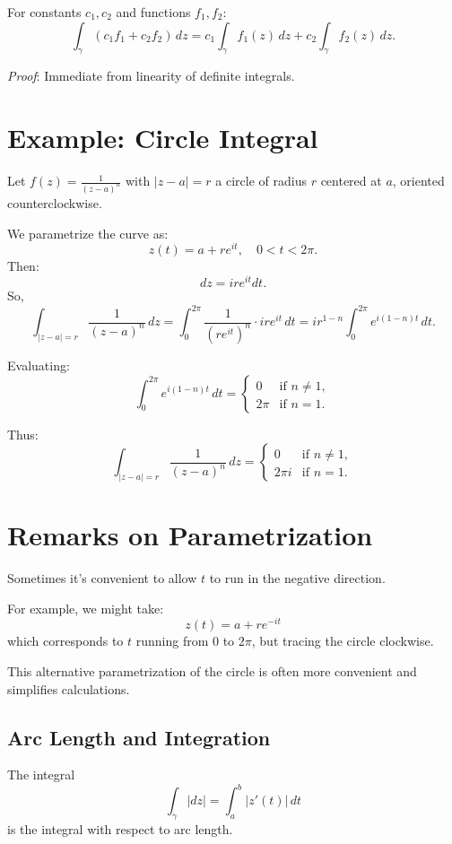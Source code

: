 \documentclass[12pt]{article}
\theoremstyle{definition} %
\theoremstyle{plain} %
\begin{document}
For constants $c_1, c_2$ and functions $f_1, f_2$:
\[
\int_{\gamma} \left( c_1 f_1 + c_2 f_2 \right)\,dz = c_1 \int_{\gamma} f_1(z)\,dz + c_2 \int_{\gamma} f_2(z)\,dz.
\]

\textit{Proof}: Immediate from linearity of definite integrals.

\section*{Example: Circle Integral}

Let $f(z) = \frac{1}{(z - a)^n}$ with $|z - a| = r$ a circle of radius $r$ centered at $a$, oriented counterclockwise.

We parametrize the curve as:
\[
z(t) = a + re^{it}, \quad 0 < t < 2\pi.
\]
Then:
\[
dz = ire^{it}dt.
\]
So,
\[
\int_{|z - a| = r} \frac{1}{(z - a)^n}\,dz = \int_0^{2\pi} \frac{1}{(re^{it})^n} \cdot ire^{it}\,dt = ir^{1-n} \int_0^{2\pi} e^{i(1-n)t}\,dt.
\]

Evaluating:
\[
\int_0^{2\pi} e^{i(1-n)t}\,dt =
\begin{cases}
0 & \text{if } n \neq 1, \\
2\pi & \text{if } n = 1.
\end{cases}
\]

Thus:
\[
\int_{|z - a| = r} \frac{1}{(z - a)^n}\,dz =
\begin{cases}
0 & \text{if } n \neq 1, \\
2\pi i & \text{if } n = 1.
\end{cases}
\]

\section*{Remarks on Parametrization}

Sometimes it's convenient to allow $t$ to run in the negative direction.

For example, we might take:
\[
z(t) = a + re^{-it}
\]
which corresponds to $t$ running from $0$ to $2\pi$, but tracing the circle clockwise.

This alternative parametrization of the circle is often more convenient and simplifies calculations.

\subsection*{Arc Length and Integration}

The integral
\[
\int_{\gamma} |dz| = \int_a^b |z'(t)|\,dt
\]
is the integral with respect to arc length.
\end{document}
